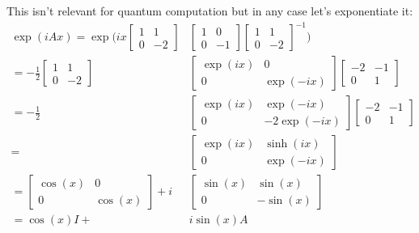 \documentclass[]{article}
\begin{document}
This isn't relevant for quantum computation but in any case let's exponentiate it:
\begin{align*}
\exp(iAx)=
\exp(ix\left[\begin{matrix}
1&1\\
0&-2
\end{matrix}\right]
&\left[\begin{matrix}
1&0\\
0&-1
\end{matrix}\right]
\left[\begin{matrix}
1&1\\
0&-2
\end{matrix}\right]^{-1}
)
\\=
-\frac{1}{2}
\left[\begin{matrix}
1&1\\
0&-2
\end{matrix}\right]
&\left[\begin{matrix}
\exp(ix)&0\\
0&\exp(-ix)
\end{matrix}\right]
\left[\begin{matrix}
-2&-1\\
0&1
\end{matrix}\right]
\\=
-\frac{1}{2}
&\left[\begin{matrix}
\exp(ix)&\exp(-ix)\\
0&-2\exp(-ix)
\end{matrix}\right]
\left[\begin{matrix}
-2&-1\\
0&1
\end{matrix}\right]
\\=
&\left[\begin{matrix}
\exp(ix)&\sinh(ix)\\
0&\exp(-ix)
\end{matrix}\right]
\\=
\left[\begin{matrix}
\cos(x)&0\\
0&\cos(x)
\end{matrix}\right]
+i&\left[\begin{matrix}
\sin(x)&\sin(x)\\
0&-\sin(x)
\end{matrix}\right]
\\=\cos(x)I+&i\sin(x)A
\end{align*}
\end{document}
